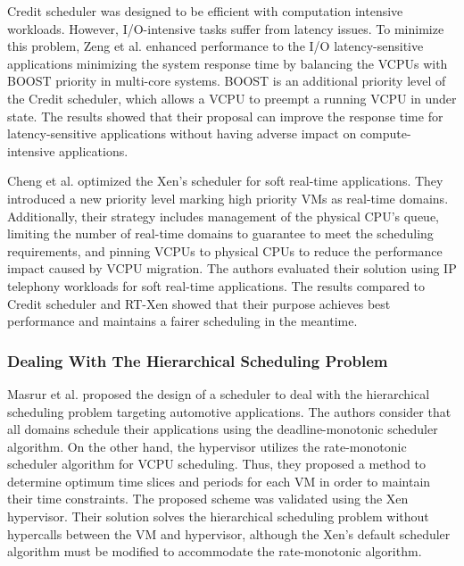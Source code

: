 Credit scheduler was designed to be efficient with computation intensive workloads. However, I/O-intensive tasks suffer from latency issues. To minimize this problem, Zeng et al. \cite{zeng2013} enhanced performance to the I/O latency-sensitive applications minimizing the system response time by balancing the VCPUs with BOOST priority in multi-core systems. BOOST is an additional priority level of the Credit scheduler, which allows a VCPU to preempt a running VCPU in under state. The results showed that their proposal can improve the response time for latency-sensitive applications without having adverse impact on compute-intensive applications. 
 
Cheng et al. \cite{cheng2015} optimized the Xen's scheduler for soft real-time applications. They introduced a new priority level marking high priority VMs as real-time domains. Additionally, their strategy includes management of the physical CPU's queue, limiting the number of real-time domains to guarantee to meet the scheduling requirements, and pinning VCPUs to physical CPUs to reduce the performance impact caused by VCPU migration. The authors evaluated their solution using IP telephony workloads for soft real-time applications. The results compared to Credit scheduler and RT-Xen showed that their purpose achieves best performance and maintains a fairer scheduling in the meantime.

\subsubsection{Dealing With The Hierarchical Scheduling Problem}

Masrur et al. \cite{Masrur2011} proposed the design of a scheduler to deal with the hierarchical scheduling problem targeting automotive applications. The authors consider that all domains schedule their applications using the deadline-monotonic scheduler algorithm. On the other hand, the hypervisor utilizes the rate-monotonic scheduler algorithm \cite{Buttazzo2005} \cite{brun2015} for VCPU scheduling. Thus, they proposed a method to determine optimum time slices and periods for each VM in order to maintain their time constraints. The proposed scheme was validated using the Xen hypervisor. Their solution solves the hierarchical scheduling problem without hypercalls between the VM and hypervisor, although the Xen's default scheduler algorithm must be modified to accommodate the rate-monotonic algorithm. 

